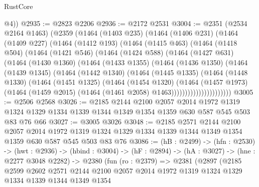 \begin{lexlean}{RustCore}
\begin{coremodule}
        @4))
@2935 := @2823 @2206
@2936 := @2172 @2531
@3004 := @2351
    (@2534 @2164 @1463)
    (@2359
      (@1464
        (@1403 @235)
        (@1464
          (@1406 @231)
          (@1464
            (@1409 @227)
            (@1464
              (@1412 @193)
              (@1464
                (@1415 @463)
                (@1464
                  (@1418 @504)
                  (@1464
                    (@1421 @546)
                    (@1464
                      (@1424 @588)
                      (@1464
                        (@1427 @631)
                        (@1464
                          (@1430 @1360)
                          (@1464
                            (@1433 @1355)
                            (@1464
                              (@1436 @1350)
                              (@1464
                                (@1439 @1345)
                                (@1464
                                  (@1442 @1340)
                                  (@1464
                                    (@1445 @1335)
                                    (@1464
                                      (@1448 @1330)
                                      (@1464
                                        (@1451 @1325)
                                        (@1464
                                          (@1454 @1320)
                                          (@1464
                                            (@1457 @1973)
                                            (@1464
                                              (@1459 @2015)
                                              (@1464 (@1461 @2058) @1463))))))))))))))))))))))
@3005 := @2506 @2568
@3026 := @2185
    @2144
    @2100
    @2057
    @2014
    @1972
    @1319
    @1324
    @1329
    @1334
    @1339
    @1344
    @1349
    @1354
    @1359
    @630
    @587
    @545
    @503
    @83
    @76
    @66
@3027 := @3005 @3026
@3048 := @2185
    @2571
    @2144
    @2100
    @2057
    @2014
    @1972
    @1319
    @1324
    @1329
    @1334
    @1339
    @1344
    @1349
    @1354
    @1359
    @630
    @587
    @545
    @503
    @83
    @76
@3086 := (hB : @2499) ->
  (hfn : @2530) ->
  (hwt : @2936) ->
  (hbind : @3004) ->
  (hF : @2894) ->
  (hA : @3027) ->
  (hne : @2277 @3048 @2282) ->
  @2380
    (fun (ro : @2379) =>
    @2381
      (@2897
        (@2185
          @2599
          @2602
          @2571
          @2144
          @2100
          @2057
          @2014
          @1972
          @1319
          @1324
          @1329
          @1334
          @1339
          @1344
          @1349
          @1354

\end{coremodule}
\end{lexlean}
